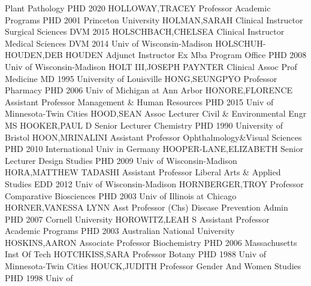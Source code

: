 \documentclass[
]{article}
\begin{document}
\textbar Plant Pathology \textbar PHD 2020 \textbar{} 
\textbar HOLLOWAY,TRACEY \textbar Professor \textbar Academic Programs
\textbar PHD 2001 Princeton University \textbar{} 
\textbar HOLMAN,SARAH \textbar Clinical Instructor \textbar Surgical
Sciences \textbar DVM 2015 \textbar{} 
\textbar HOLSCHBACH,CHELSEA \textbar Clinical Instructor
\textbar Medical Sciences \textbar DVM 2014 Univ of Wisconsin-Madison
\textbar{}  \textbar HOLSCHUH-HOUDEN,DEB HOUDEN
\textbar Adjunct Instructor \textbar Ex Mba Program Office \textbar PHD
2008 Univ of Wisconsin-Madison \textbar{}  \textbar HOLT
III,JOSEPH PAYNTER \textbar Clinical Assoc Prof \textbar Medicine
\textbar MD 1995 University of Louisville \textbar{} 
\textbar HONG,SEUNGPYO \textbar Professor \textbar Pharmacy \textbar PHD
2006 Univ of Michigan at Ann Arbor \textbar{} 
\textbar HONORE,FLORENCE \textbar Assistant Professor
\textbar Management \& Human Resources \textbar PHD 2015 Univ of
Minnesota-Twin Cities \textbar{}  \textbar HOOD,SEAN
\textbar Assoc Lecturer \textbar Civil \& Environmental Engr \textbar MS
\textbar{}  \textbar HOOKER,PAUL D \textbar Senior Lecturer
\textbar Chemistry \textbar PHD 1990 University of Bristol \textbar{}
 \textbar HOON,MRINALINI \textbar Assistant Professor
\textbar Ophthalmology\&Visual Sciences \textbar PHD 2010 International
Univ in Germany \textbar{}  \textbar HOOPER-LANE,ELIZABETH
\textbar Senior Lecturer \textbar Design Studies \textbar PHD 2009 Univ
of Wisconsin-Madison \textbar{}  \textbar HORA,MATTHEW
TADASHI \textbar Assistant Professor \textbar Liberal Arts \& Applied
Studies \textbar EDD 2012 Univ of Wisconsin-Madison \textbar{}
 \textbar HORNBERGER,TROY \textbar Professor
\textbar Comparative Biosciences \textbar PHD 2003 Univ of Illinois at
Chicago \textbar{}  \textbar HORNER,VANESSA LYNN
\textbar Asst Professor (Chs) \textbar Disease Prevention Admin
\textbar PHD 2007 Cornell University \textbar{} 
\textbar HOROWITZ,LEAH S \textbar Assistant Professor \textbar Academic
Programs \textbar PHD 2003 Australian National University \textbar{}
 \textbar HOSKINS,AARON \textbar Associate Professor
\textbar Biochemistry \textbar PHD 2006 Massachusetts Inst Of Tech
\textbar{}  \textbar HOTCHKISS,SARA \textbar Professor
\textbar Botany \textbar PHD 1988 Univ of Minnesota-Twin Cities
\textbar{}  \textbar HOUCK,JUDITH \textbar Professor
\textbar Gender And Women Studies \textbar PHD 1998 Univ of
\end{document}
